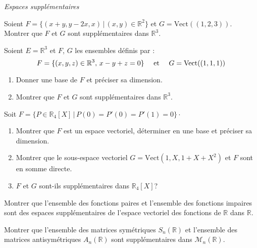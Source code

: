 \documentclass[a4paper,10pt]{report}
\begin{document}
\medskip

\begin{center}
\textit{{ {\large Espaces supplémentaires}}}
\end{center}

\medskip

\begin{Exa} Soient $F= \lbrace (x+y,y-2x, x) \, \vert \,  (x,y) \in \mathbb{R}^2 \rbrace$ et $G = \textrm{Vect}((1,2,3))$. Montrer que $F$ et $G$ sont supplémentaires dans $\mathbb{R}^3$.
\end{Exa} 

\begin{Exa} Soient $E= \mathbb{R}^3$ et $F$, $G$ les ensembles définis par :
$$ F = \lbrace (x,y,z) \in \mathbb{R}^3, \, x-y+z=0 \rbrace \quad \hbox{ et }  \quad G = \textrm{Vect}((1,1,1)) $$

\begin{enumerate}
\item Donner une base de $F$ et préciser sa dimension.
\item Montrer que $F$ et $G$ sont supplémentaires dans $\mathbb{R}^3$.
\end{enumerate}
\end{Exa}

\begin{Exa} Soit $F = \lbrace P \in \mathbb{R}_4[X] \, \vert \, P(0)=P'(0)=P'(1)=0 \rbrace \cdot$

\begin{enumerate}
\item Montrer que $F$ est un espace vectoriel, déterminer en une base et préciser sa dimension.
\item Montrer que le sous-espace vectoriel $G= \textrm{Vect}(1,X,1+X+X^2)$ et $F$  sont en somme directe.
\item $F$ et $G$ sont-ils supplémentaires dans $\mathbb{R}_4[X]$?
\end{enumerate}
\end{Exa}

\begin{Exa} Montrer que l'ensemble des fonctions paires et l'ensemble des fonctions impaires sont des espaces supplémentaires de l'espace vectoriel des fonctions de $\mathbb{R}$ dans $\mathbb{R}$. 
\end{Exa}


\begin{Exa} Montrer que l'ensemble des matrices symétriques $S_n(\mathbb{R})$ et l'ensemble des matrices antisymétriques $A_n(\mathbb{R})$ sont supplémentaires dans $\mathcal{M}_n(\mathbb{R})$.
\end{Exa}
\end{document}
